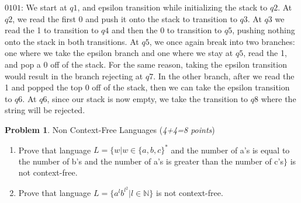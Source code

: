 \documentclass[11pt]{article}
\theoremstyle{definition}
\theoremstyle{theorem}
\newtheorem{prob}{Problem}
\newcommand{\solution}{\medskip\noindent{\color{blue}\textbf{Solution:}}}
\begin{document}
\begin{enumerate}[label=(\alph*)]
$0101$: We start at $q1$, and epsilon transition while initializing the stack to $q2$. At $q2$, we read the first 0 and push it onto the stack to transition to $q3$. At $q3$ we read the 1 to transition to $q4$ and then the 0 to transition to $q5$, pushing nothing onto the stack in both transitions.
At $q5$, we once again break into two branches: one where we take the epsilon branch and one where we stay at $q5$, read the 1, and pop a 0 off of the stack. For the same reason, taking the epsilon transition would result in the branch rejecting at $q7$. In the other branch, after we read the 1 and popped the top 0 off of the stack, then we can take the epsilon transition to $q6$. At $q6$, since our stack is now empty, we take the transition to $q8$ where the string will be rejected.









\newpage

\begin{prob} Non Context-Free Languages (\emph{4+4=8 points})\end{prob}

\begin{enumerate}[label=(\alph*)]

\item Prove that language $L = \{w | w \in \{a,b,c\}^*$ and the number of a's is equal to the number of b's and the number of a's is greater than the number of c's$\}$ is not context-free.

\solution



\item Prove that language $L = \{a^l b^{l^2} | l \in \mathbb{N}\}$ is not context-free.

\solution



\end{enumerate}



\end{enumerate}
\end{document}
